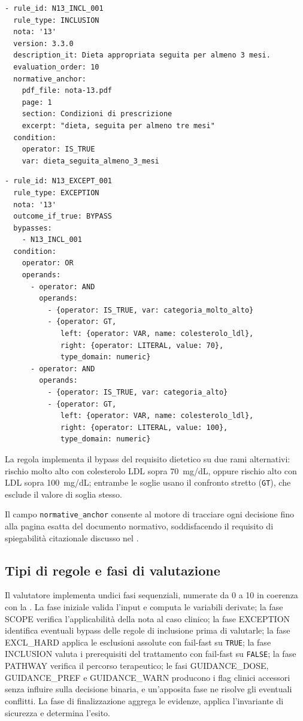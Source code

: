 \begin{verbatim}
- rule_id: N13_INCL_001
  rule_type: INCLUSION
  nota: '13'
  version: 3.3.0
  description_it: Dieta appropriata seguita per almeno 3 mesi.
  evaluation_order: 10
  normative_anchor:
    pdf_file: nota-13.pdf
    page: 1
    section: Condizioni di prescrizione
    excerpt: "dieta, seguita per almeno tre mesi"
  condition:
    operator: IS_TRUE
    var: dieta_seguita_almeno_3_mesi
\end{verbatim}

\begin{verbatim}
- rule_id: N13_EXCEPT_001
  rule_type: EXCEPTION
  nota: '13'
  outcome_if_true: BYPASS
  bypasses:
    - N13_INCL_001
  condition:
    operator: OR
    operands:
      - operator: AND
        operands:
          - {operator: IS_TRUE, var: categoria_molto_alto}
          - {operator: GT,
             left: {operator: VAR, name: colesterolo_ldl},
             right: {operator: LITERAL, value: 70},
             type_domain: numeric}
      - operator: AND
        operands:
          - {operator: IS_TRUE, var: categoria_alto}
          - {operator: GT,
             left: {operator: VAR, name: colesterolo_ldl},
             right: {operator: LITERAL, value: 100},
             type_domain: numeric}
\end{verbatim}
La regola implementa il bypass del requisito dietetico su due rami alternativi:
rischio molto alto con colesterolo LDL sopra 70~mg/dL, oppure rischio alto
con LDL sopra 100~mg/dL; entrambe le soglie usano il confronto stretto
(\texttt{GT}), che esclude il valore di soglia stesso.

Il campo \texttt{normative\_anchor} consente al motore di tracciare ogni
decisione fino alla pagina esatta del documento normativo, soddisfacendo il
requisito di spiegabilità citazionale discusso nel .

\subsection{Tipi di regole e fasi di valutazione}

Il valutatore implementa undici fasi sequenziali, numerate da 0 a 10 in
coerenza con la . La fase iniziale valida l'input e
computa le variabili derivate; la fase SCOPE verifica
l'applicabilità della nota al caso clinico; la fase EXCEPTION identifica
eventuali bypass delle regole di inclusione prima di valutarle; la fase
EXCL\_HARD applica le esclusioni assolute con fail-fast su \texttt{TRUE}; la
fase INCLUSION valuta i prerequisiti del trattamento con fail-fast su
\texttt{FALSE}; la fase PATHWAY verifica il percorso terapeutico; le fasi
GUIDANCE\_DOSE, GUIDANCE\_PREF e GUIDANCE\_WARN producono i flag clinici
accessori senza influire sulla decisione binaria, e un'apposita fase ne
risolve gli eventuali conflitti. La fase di finalizzazione
aggrega le evidenze, applica l'invariante di sicurezza e determina l'esito.

